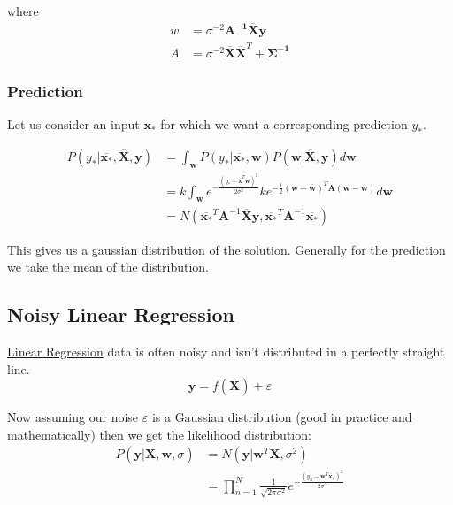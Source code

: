 \documentclass[12pt]{article}
\begin{document}
        where
        \begin{align*}
        \overline{w} &= \sigma^{-2}\boldsymbol{A^{-1}}\overline{\boldsymbol{X}}\boldsymbol{y} \\
        A &= \sigma^{-2}\boldsymbol{\overline{X}\overline{X}}^T + \boldsymbol{\Sigma^{-1}}
        \end{align*}

        \subsubsection{Prediction}
            Let us consider an input $\boldsymbol{x_*}$ for which we want a corresponding prediction $y_*$.

            \begin{align*}
                P(y_*|\overline{\boldsymbol{x_*}}, \overline{\boldsymbol{X}}, \boldsymbol{y}) &= \int_{\boldsymbol{w}} P(y_*|\overline{\boldsymbol{x_*}},\boldsymbol{w})P(\boldsymbol{w}|\overline{\boldsymbol{X}},\boldsymbol{y})d\boldsymbol{w} \\
                &= k \int_{\boldsymbol{w}} e^{-\frac{(y_* - \overline{\boldsymbol{x}}^T\boldsymbol{w})^2}{2\sigma^2}} ke^{-\frac{1}{2}(\boldsymbol{w}-\overline{\boldsymbol{w}})^T\boldsymbol{A}(\boldsymbol{w}-\overline{\boldsymbol{w}})}d\boldsymbol{w} \\
                &= N(\overline{\boldsymbol{x_*}}^T \boldsymbol{A}^{-1}\overline{\boldsymbol{X}}\boldsymbol{y}, \overline{\boldsymbol{x_*}}^T \boldsymbol{A}^{-1} \overline{\boldsymbol{x_*}})
            \end{align*}

            This gives us a gaussian distribution of the solution. Generally for the prediction we take the mean of the
            distribution. 
    
    \subsection{Noisy Linear Regression} \label{sec:StatisticalLinearRegression}
        \hyperref[sec:LinearRegression]{Linear Regression} data is often noisy and isn't distributed in a perfectly
        straight line. 
        $$ \boldsymbol{y} = f(\overline{\boldsymbol{X}}) + \varepsilon $$

        Now assuming our noise $\varepsilon$ is a Gaussian distribution (good in practice and mathematically) then we
        get the likelihood distribution:
        \begin{align*}
            P(\boldsymbol{y}|\overline{\boldsymbol{X}},\boldsymbol{w}, \sigma) &= N(\boldsymbol{y}|\boldsymbol{w}^T\overline{\boldsymbol{X}}, \sigma^2) \\
            &= \prod_{n=1}^N \frac{1}{\sqrt{2\pi\sigma^2}}e^{-\frac{(y_n - \boldsymbol{w}^T \overline{\boldsymbol{x}}_n)^2}{2\sigma^2}}
        \end{align*}
        
\end{document}
